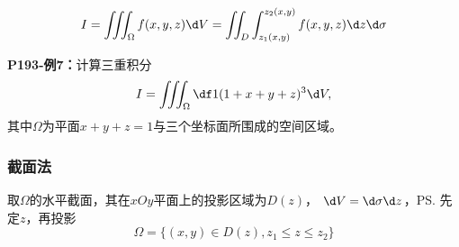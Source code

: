 \begin{center}
\end{center}

$${I=\iiint_{\Omega}f(x,y,z)\d
V=\iint_D\int_{z_1(x,y)}^{z_2(x,y)}f(x,y,z)\d z\d\sigma}$$

{\bf P193-例7：}计算三重积分
$$I=\iiint_{\Omega}\df 1{(1+x+y+z)^3}\d V,$$
其中$\Omega$为平面$x+y+z=1$与三个坐标面所围成的空间区域。

\subsubsection{截面法}

取$\Omega$的水平截面，其在$xOy$平面上的投影区域为$D(z)$，
$\d V=\d\sigma \d z$，\ps{先定$z$，再投影}
$$\Omega=\{(x,y)\in D(z),z_1\leq z\leq z_2\}$$

\begin{center}
\end{center}

